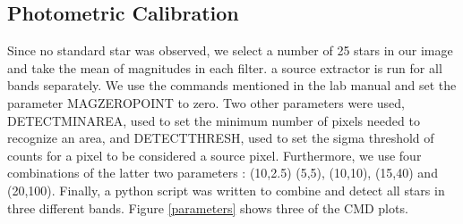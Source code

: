 \documentclass[12pt]{article}
\begin{document}
\subsection{Photometric Calibration}
Since no standard star was observed, we select a number of 25 stars in our image and take the mean of magnitudes in each filter. a source extractor is run for all bands separately. We use the commands mentioned in the lab manual and set the parameter MAG\textunderscore ZEROPOINT to zero. Two other parameters were used, DETECT\textunderscore MINAREA, used to set the minimum number of pixels needed to recognize an area, and DETECT\textunderscore THRESH, used to set the sigma threshold of counts for a pixel to be considered a source pixel. Furthermore, we use four combinations of the latter two parameters :  (10,2.5) (5,5), (10,10), (15,40) and (20,100). Finally, a python script was written to combine and detect all stars in three different bands. Figure \ref{parameters} shows three of the CMD plots.
\end{document}
